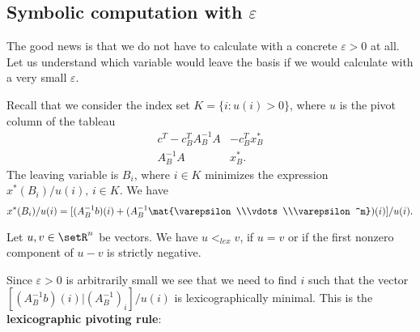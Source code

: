 \subsection{Symbolic computation with $\varepsilon$} 
\label{sec:symb-comp-with}

The good news is that we do not have to calculate with a concrete
$\varepsilon>0$ at all. Let us understand which variable would leave the basis
if we would calculate with a very small $\varepsilon$. 

Recall that we consider the index set $K = \{ i \colon u(i)>0\}$, where
$u$ is the pivot column of the tableau 
\begin{displaymath}
  \label{c:eq:37}
  \begin{array}{c|c}
    c^T - c_B^TA_B^{-1}A & -c_B^Tx^*_B \\ \hline 
    A_B^{-1}A        & x^*_B.
  \end{array}
\end{displaymath}
The leaving variable is  $B_i$, where $i \in K$ minimizes the expression
$x^*(B_i) / u(i), \, i \in K$. We have 
\begin{displaymath}
  x^*(B_i) / u(i) = [(A_B^{-1} b)(i) + (A_B^{-1} \mat{\varepsilon\\\vdots\\\varepsilon^m}) (i)] / u(i). 
\end{displaymath}

\begin{definition}
  Let $u,v \in \setR^n$ be vectors. We have $u<_{lex}v$, if $u=v$ or if
  the first nonzero component of $u-v$ is strictly negative. 
\end{definition}

Since $\varepsilon>0$ is arbitrarily  small we see that we need to find $i$
such that the vector $ [ (A_B^{-1} b)(i) | (A_B^{-1})_i] / u(i)$ is lexicographically
minimal. This is  the {\bf  lexicographic
pivoting rule}: 


